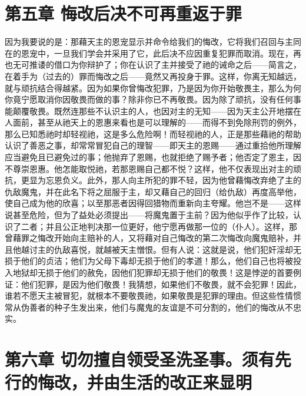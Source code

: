 
\section{第五章 悔改后决不可再重返于罪}

因为我要说的是：那藉天主的恩宠显示并命令给我们的悔改，它将我们召回与主同在的恩宠中，一旦我们学会并采用了它，此后决不应因重复犯罪而取消。现在，再也无可推诿的借口为你辩护了；你在认识了主并接受了祂的诫命之后——简言之，在着手为（过去的）罪而悔改之后——竟然又再投身于罪。这样，你离无知越远，就与顽抗结合得越紧。因为如果你曾悔改犯罪，乃是因为你开始敬畏主，那么为何你竟宁愿取消你因敬畏而做的事？除非你已不再敬畏。因为除了顽抗，没有任何事能颠覆敬畏。既然连那些不认识主的人，也因对主的无知——因为天主公开地摆在人面前，甚至从祂天上的恩惠来看也是可以理解的——而得不到免除刑罚的例外，那么已知悉祂时却轻视祂，这是多么危险啊！而轻视祂的人，正是那些藉祂的帮助认识了善恶之事，却常常冒犯自己的理智——即天主的恩赐——通过重拾他所理解应当避免且已避免过的事；他抛弃了恩赐，也就拒绝了赐予者；他否定了恩主，因不尊崇恩惠。他怎能取悦祂，若那恩赐自己都不悦？这样，他不仅表现出对主的顽抗，更显为忘恩负义。此外，那人向主所犯的罪不轻，因为他曾藉悔改弃绝了主的仇敌魔鬼，并在此名下将之屈服于主，却又藉自己的回归（给仇敌）再度高举他，使自己成为他的欣喜；以至那恶者因得回猎物而重新向主夸耀。他岂不是——这样说甚至危险，但为了益处必须提出——将魔鬼置于主前？因为他似乎作了比较，认识了二者；并且公正地判决那一位更好，他宁愿再做那一位的（仆人）。这样，那曾藉罪之悔改开始向主赔补的人，又将藉对自己悔改的第二次悔改向魔鬼赔补，并且他越讨主的仇敌喜悦，就越被天主憎恨。但有人说：这就是说，他们犯奸淫却无损于他们的贞洁；他们为父母下毒却无损于他们的孝道！那么，他们自己也将被投入地狱却无损于他们的赦免，因他们犯罪却无损于他们的敬畏！这是悖逆的首要例证：他们犯罪，是因为他们敬畏！我猜想，如果他们不敬畏，就不会犯罪！因此，谁若不愿天主被冒犯，就根本不要敬畏祂，如果敬畏是犯罪的理由。但这些性情惯常从伪善者的种子生发出来，他们与魔鬼的友谊是不可分割的，他们的悔改从不忠实。\par


\section{第六章 切勿擅自领受圣洗圣事。须有先行的悔改，并由生活的改正来显明}

